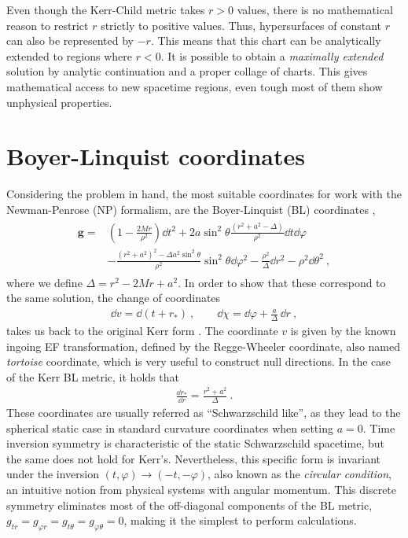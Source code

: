 Even though the Kerr-Child metric takes $r>0$ values, there is no mathematical reason to restrict $r$ strictly to positive values.
Thus, hypersurfaces of constant $r$ can also be represented by $-r$. 
This means that this chart can be analytically extended to regions where $r<0$.
It is possible to obtain a \emph{maximally extended} solution by analytic continuation and a proper collage of charts.
This gives mathematical access to new spacetime regions, even tough most of them show unphysical properties.

\section{Boyer-Linquist coordinates}

Considering the problem in hand, the most suitable coordinates for work with the Newman-Penrose (NP) formalism, are the Boyer-Linquist (BL) coordinates \cite{Boyer1967},
\begin{align}
    \begin{split}
        \bm{g} = & \left(1 - \frac{2 M r}{\rho^2} \right) \dd t^2 + 2 a \sin^2\theta \frac{(r^2+a^2-\Delta)}{\rho^2} \dd t \dd \varphi \\
        &- \frac{(r^2+a^2)^2- \Delta a^2 \sin^2\theta}{\rho^2} \sin^2\theta \dd\varphi^2 - \frac{\rho^2}{\Delta} \dd r^2 - \rho^2 \dd \theta^2 ~,
    \end{split}
    \label{eq2:KerrBL}
\end{align}
where we define $\Delta=r^2-2 M r + a^2$.
In order to show that these correspond to the same solution, the change of coordinates
\begin{align}
    \dd v = \dd ( t + r_* ) ~, \qquad \dd \chi = \dd \varphi + \frac{a}{\Delta} \,\dd r ~,
    \label{eq2:InEFtoBL}
\end{align}
takes us back to the original Kerr form .
The coordinate $v$ is given by the known ingoing EF transformation, defined by the Regge-Wheeler coordinate, also named \emph{tortoise} coordinate, which is very useful to construct null directions.
In the case of the Kerr BL metric, it holds that
\begin{align}
    \frac{\dd r_*}{\dd r} = \frac{r^2+a^2}{\Delta} ~.
    \label{eq2:tortoise}
\end{align}
These coordinates are usually referred as ``Schwarzschild like'', as they lead to the spherical static case in standard curvature coordinates when setting $a=0$. 
Time inversion symmetry is characteristic of the static Schwarzschild spacetime, but the same does not hold for Kerr's.
Nevertheless, this specific form is invariant under the inversion $(t,\varphi)\to(-t,-\varphi)$, also known as the \emph{circular condition}, an intuitive notion from physical systems with angular momentum.
This discrete symmetry eliminates most of the off-diagonal components of the BL metric, $g_{tr} = g_{\varphi r} = g_{t \theta} = g_{\varphi \theta} = 0$, making it the simplest to perform calculations.

